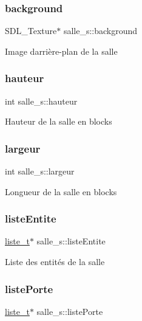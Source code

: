 \subsubsection{\texorpdfstring{background}{background}}
{\footnotesize\ttfamily S\+D\+L\+\_\+\+Texture$\ast$ salle\+\_\+s\+::background}

Image d\textquotesingle{}arrière-\/plan de la salle \mbox{\label{structsalle__s_a2be13fedfc5f31bc7f02c65af7d95c7a}} 
\subsubsection{\texorpdfstring{hauteur}{hauteur}}
{\footnotesize\ttfamily int salle\+\_\+s\+::hauteur}

Hauteur de la salle en blocks \mbox{\label{structsalle__s_ac1273e8d176620c3b9130d2f1e741315}} 
\subsubsection{\texorpdfstring{largeur}{largeur}}
{\footnotesize\ttfamily int salle\+\_\+s\+::largeur}

Longueur de la salle en blocks \mbox{\label{structsalle__s_a6c6c65ac4a856dbf75a104081e839b96}} 
\subsubsection{\texorpdfstring{liste\+Entite}{listeEntite}}
{\footnotesize\ttfamily \hyperlink{structliste__s}{liste\+\_\+t}$\ast$ salle\+\_\+s\+::liste\+Entite}

Liste des entités de la salle \mbox{\label{structsalle__s_a8c3b513a26b2418863a37bfd91f86b11}} 
\subsubsection{\texorpdfstring{liste\+Porte}{listePorte}}
{\footnotesize\ttfamily \hyperlink{structliste__s}{liste\+\_\+t}$\ast$ salle\+\_\+s\+::liste\+Porte}

